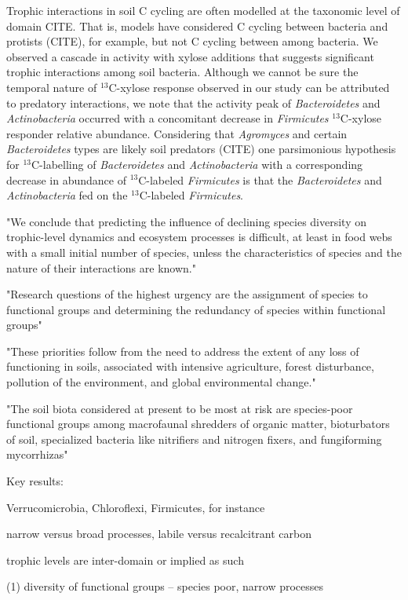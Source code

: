 Trophic interactions in soil C cycling are often modelled at the taxonomic
level of domain CITE. That is, models have considered C cycling between
bacteria and protists (CITE), for example, but not C cycling between among
bacteria. We observed a cascade in activity with xylose additions that
suggests significant trophic interactions among soil bacteria. Although we
cannot be sure the temporal nature of $^{13}$C-xylose response observed in our
study can be attributed to predatory interactions, we note that the activity
peak of \textit{Bacteroidetes} and \textit{Actinobacteria} occurred with
a concomitant decrease in \textit{Firmicutes} $^{13}$C-xylose responder
relative abundance. Considering that \textit{Agromyces} and certain
\textit{Bacteroidetes} types are likely soil predators (CITE) one parsimonious
hypothesis for $^{13}$C-labelling of \textit{Bacteroidetes} and
\textit{Actinobacteria} with a corresponding decrease in abundance of
$^{13}$C-labeled \textit{Firmicutes} is that the \textit{Bacteroidetes} and
\textit{Actinobacteria} fed on the $^{13}$C-labeled \textit{Firmicutes}. 

"We conclude that predicting the influence of declining species diversity on
trophic-level dynamics and ecosystem processes is difficult, at least in food
webs with a small initial number of species, unless the characteristics of
species and the nature of their interactions are known."

"Research questions of the highest urgency are the assignment of species
to functional groups and determining the redundancy of species within
functional groups"

"These priorities follow from the need to address the extent of any loss
of functioning in soils, associated with intensive agriculture, forest
disturbance, pollution of the environment, and global environmental
change."

"The soil biota considered at present to be most at risk are species-poor
functional groups among macrofaunal shredders of organic matter,
bioturbators of soil, specialized bacteria like nitrifiers and nitrogen
fixers, and fungiforming mycorrhizas" 

Key results:

Verrucomicrobia, Chloroflexi, Firmicutes, for instance

narrow versus broad processes, labile versus recalcitrant carbon

trophic levels are inter-domain or implied as such

(1) diversity of functional groups -- species poor, narrow processes 

